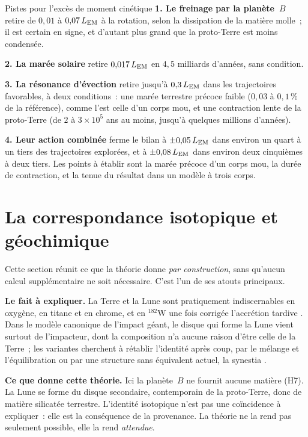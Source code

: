 \documentclass[11pt,a4paper]{article}
\newcommand{\LEM}{\ensuremath{L_{\rm EM}}}
\begin{document}
\begin{encadre}{Pistes pour l'excès de moment cinétique}
\small
\textbf{1. Le freinage par la planète~$B$} retire de $0{,}01$ à $0{,}07\,\LEM$ à la rotation, selon la dissipation de la matière molle~; il est certain en signe, et d'autant plus grand que la proto-Terre est moins condensée.

\smallskip\noindent\textbf{2. La marée solaire} retire $0{,}017\,\LEM$ en $4{,}5$ milliards d'années, sans condition.

\smallskip\noindent\textbf{3. La résonance d'évection} retire jusqu'à $0{,}3\,\LEM$ dans les trajectoires favorables, à deux conditions~: une marée terrestre précoce faible ($0{,}03$ à $0{,}1\,\%$ de la référence), comme l'est celle d'un corps mou, et une contraction lente de la proto-Terre (de $2$ à $3\times10^5$ ans au moins, jusqu'à quelques millions d'années).

\smallskip\noindent\textbf{4. Leur action combinée} ferme le bilan à $\pm0{,}05\,\LEM$ dans environ un quart à un tiers des trajectoires explorées, et à $\pm0{,}08\,\LEM$ dans environ deux cinquièmes à deux tiers. Les points à établir sont la marée précoce d'un corps mou, la durée de contraction, et la tenue du résultat dans un modèle à trois corps.
\end{encadre}

\section{La correspondance isotopique et géochimique}
\label{sec:isotopes}

Cette section réunit ce que la théorie donne \emph{par construction}, sans qu'aucun calcul supplémentaire ne soit nécessaire. C'est l'un de ses atouts principaux.

\textbf{Le fait à expliquer.} La Terre et la Lune sont pratiquement indiscernables en oxygène, en titane et en chrome, et en $^{182}$W une fois corrigée l'accrétion tardive \citep{Young2016,Zhang2012,Dauphas2017,Kruijer2015,Touboul2015}. Dans le modèle canonique de l'impact géant, le disque qui forme la Lune vient surtout de l'impacteur, dont la composition n'a aucune raison d'être celle de la Terre~; les variantes cherchent à rétablir l'identité après coup, par le mélange et l'équilibration \citep{PahlevanStevenson2007} ou par une structure sans équivalent actuel, la synestia \citep{Lock2018}.

\textbf{Ce que donne cette théorie.} Ici la planète~$B$ ne fournit aucune matière (H7). La Lune se forme du disque secondaire, contemporain de la proto-Terre, donc de matière silicatée terrestre. L'identité isotopique n'est pas une coïncidence à expliquer~: elle est la conséquence de la provenance. La théorie ne la rend pas seulement possible, elle la rend \emph{attendue}.
\end{document}
